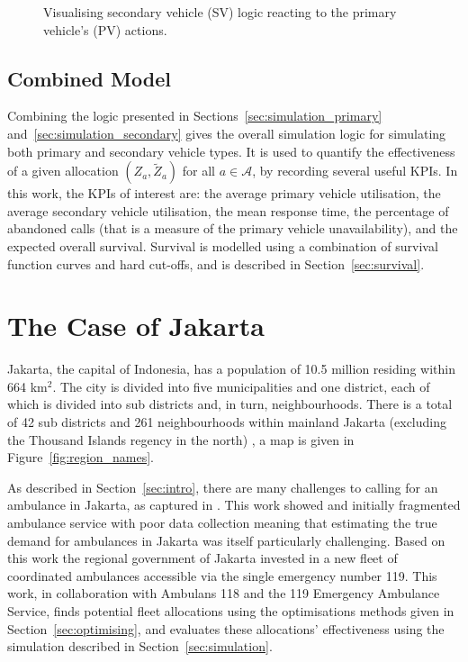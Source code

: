 \documentclass[preprint,12pt]{elsarticle}
\begin{document}
\begin{figure}
    \centering
    
    \caption{Visualising secondary vehicle (SV) logic reacting to the primary
    vehicle's (PV) actions.}
    \label{fig:sequential_logic}
\end{figure}

\subsection{Combined Model}
Combining the logic presented in Sections~\ref{sec:simulation_primary}
and~\ref{sec:simulation_secondary} gives the overall simulation logic for
simulating both primary and secondary vehicle types. It is used to quantify
the effectiveness of a given allocation $(Z_a, \tilde{Z}_a)$ for all
$a \in \mathcal{A}$, by recording several useful KPIs.
In this work, the KPIs of interest are: the average primary vehicle
utilisation, the average secondary vehicle utilisation, the mean response
time, the percentage of abandoned calls (that is a measure of the primary
vehicle unavailability), and the expected overall survival. Survival is
modelled using a combination of survival function curves and hard cut-offs,
and is described in Section~\ref{sec:survival}.



\section{The Case of Jakarta}\label{sec:jakarta}
Jakarta, the capital of Indonesia, has a population of 10.5 million
\cite{BPS_Jakarta} residing within 664 km$^2$. The city is divided into five
municipalities and one district, each of which is divided into sub districts
and, in turn, neighbourhoods. There is a total of 42 sub districts and 261
neighbourhoods within mainland Jakarta (excluding the Thousand Islands regency
in the north) \cite{BPS_Jakarta_angka}, a map is given in
Figure~\ref{fig:region_names}. 

As described in Section~\ref{sec:intro}, there are many challenges to calling
for an ambulance in Jakarta, as captured in \cite{BriceSyaribahNoor2022Esui}.
This work showed and initially fragmented ambulance service with poor data
collection meaning that estimating the true demand for ambulances in Jakarta
was itself particularly challenging.
Based on this work the regional government of Jakarta invested in a new fleet
of coordinated ambulances accessible via the single emergency number 119.
This work, in collaboration with Ambulans 118 and the 119 Emergency Ambulance
Service, finds potential fleet allocations using the optimisations methods
given in Section~\ref{sec:optimising}, and evaluates these allocations'
effectiveness using the simulation described in Section~\ref{sec:simulation}.
\end{document}
